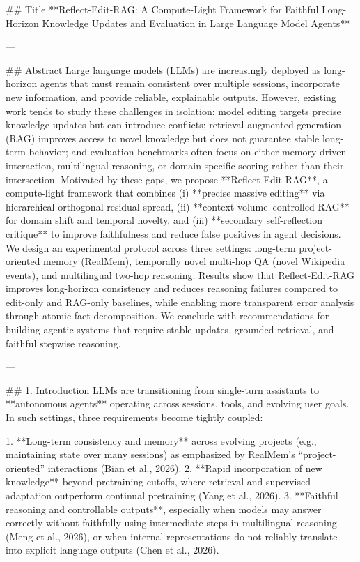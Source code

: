 ## Title  
**Reflect-Edit-RAG: A Compute-Light Framework for Faithful Long-Horizon Knowledge Updates and Evaluation in Large Language Model Agents**

---

## Abstract  
Large language models (LLMs) are increasingly deployed as long-horizon agents that must remain consistent over multiple sessions, incorporate new information, and provide reliable, explainable outputs. However, existing work tends to study these challenges in isolation: model editing targets precise knowledge updates but can introduce conflicts; retrieval-augmented generation (RAG) improves access to novel knowledge but does not guarantee stable long-term behavior; and evaluation benchmarks often focus on either memory-driven interaction, multilingual reasoning, or domain-specific scoring rather than their intersection. Motivated by these gaps, we propose **Reflect-Edit-RAG**, a compute-light framework that combines (i) **precise massive editing** via hierarchical orthogonal residual spread, (ii) **context-volume–controlled RAG** for domain shift and temporal novelty, and (iii) **secondary self-reflection critique** to improve faithfulness and reduce false positives in agent decisions. We design an experimental protocol across three settings: long-term project-oriented memory (RealMem), temporally novel multi-hop QA (novel Wikipedia events), and multilingual two-hop reasoning. Results show that Reflect-Edit-RAG improves long-horizon consistency and reduces reasoning failures compared to edit-only and RAG-only baselines, while enabling more transparent error analysis through atomic fact decomposition. We conclude with recommendations for building agentic systems that require stable updates, grounded retrieval, and faithful stepwise reasoning.

---

## 1. Introduction  
LLMs are transitioning from single-turn assistants to **autonomous agents** operating across sessions, tools, and evolving user goals. In such settings, three requirements become tightly coupled:

1. **Long-term consistency and memory** across evolving projects (e.g., maintaining state over many sessions) as emphasized by RealMem’s “project-oriented” interactions (Bian et al., 2026).  
2. **Rapid incorporation of new knowledge** beyond pretraining cutoffs, where retrieval and supervised adaptation outperform continual pretraining (Yang et al., 2026).  
3. **Faithful reasoning and controllable outputs**, especially when models may answer correctly without faithfully using intermediate steps in multilingual reasoning (Meng et al., 2026), or when internal representations do not reliably translate into explicit language outputs (Chen et al., 2026).

